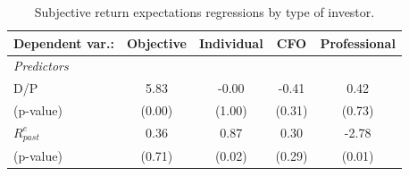 \begin{table}[t!]
    \centering
    \caption{Subjective return expectations regressions by type of investor.}
    \label{tab:nx_regression}
    \begin{tabular}{lcccc}
   \midrule \midrule
   Dependent var.:         & \textbf{Objective}           & \textbf{Individual}            & \textbf{CFO}            & \textbf{Professional}\\  
   \midrule
   \emph{Predictors}\\
   D/P            & 5.83   &  -0.00  & -0.41  & 0.42\\   
    \hspace{0.2cm}\small{(p-value)} & (0.00) &  (1.00) & (0.31) & (0.73)\\   
   $R_{past}^e$   & 0.36   &  0.87   & 0.30   & -2.78\\   
    \hspace{0.2cm}\small{(p-value)} & (0.71) & (0.02)  & (0.29) & (0.01)\\   
   \midrule \midrule
\end{tabular}
\end{table}
